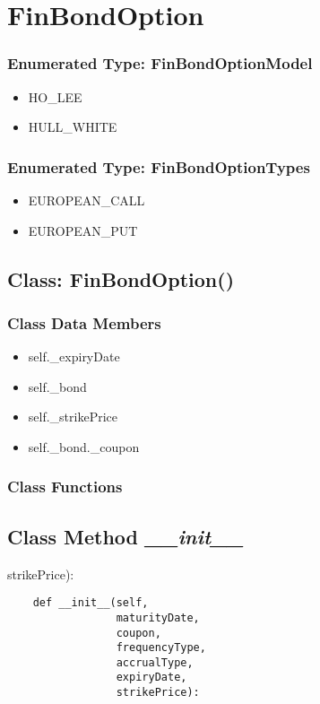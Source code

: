 \documentclass[twoside,11pt]{book}
\begin{document}
\newpage
\section{FinBondOption}

\subsubsection{Enumerated Type: FinBondOptionModel}
\begin{itemize}
\item{HO\_LEE}
\item{HULL\_WHITE}
\end{itemize}

\subsubsection{Enumerated Type: FinBondOptionTypes}
\begin{itemize}
\item{EUROPEAN\_CALL}
\item{EUROPEAN\_PUT}
\end{itemize}

\subsection{Class: FinBondOption()}


\subsubsection{Class Data Members}
\begin{itemize}
\item{self.\_expiryDate}
\item{self.\_bond}
\item{self.\_strikePrice}
\item{self.\_bond.\_coupon}
\end{itemize}

\subsubsection{Class Functions}

\subsection{Class Method {\it \_\_init\_\_}}
strikePrice):

\begin{lstlisting}
    def __init__(self,
                 maturityDate, 
                 coupon,
                 frequencyType,
                 accrualType,
                 expiryDate, 
                 strikePrice):
\end{lstlisting}
\end{document}
